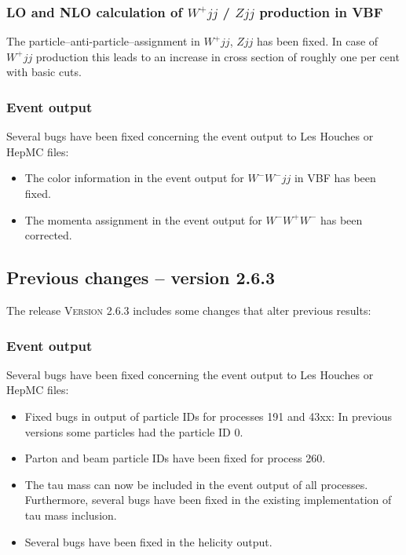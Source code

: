\documentclass[english,12pt]{article}
\begin{document}
\subsubsection{LO and NLO calculation of $W^+jj$ / $Zjj$ production in VBF}

The particle--anti-particle--assignment in $W^+jj$, $Zjj$ has been fixed.
In case of $W^+jj$ production this leads to an increase in cross section of roughly one per cent with basic cuts.


\subsubsection{Event output}

Several bugs have been fixed concerning the event output to Les Houches or HepMC files:
\begin{itemize}
 \item The color information in the event output for $W^-W^- jj$ in VBF has been fixed.
 \item The momenta assignment in the event output for $W^-W^+W^-$ has been corrected.
\end{itemize}


\subsection{Previous changes -- version 2.6.3}


The release \textsc{Version 2.6.3} includes some changes that alter previous results:

\subsubsection{Event output}

Several bugs have been fixed concerning the event output to Les Houches or HepMC files:
\begin{itemize}
 \item Fixed bugs in output of particle IDs for processes 191 and 43xx: In previous versions
       some particles had the particle ID 0.
 \item Parton and beam particle IDs have been fixed for process 260.
 \item The tau mass can now be included in the event output of all processes. Furthermore,
       several bugs have been fixed in the existing implementation of tau mass inclusion.
 \item Several bugs have been fixed in the helicity output.
\end{itemize}
\end{document}
